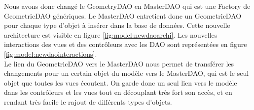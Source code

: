 		Nous avons donc changé le GeometryDAO en MasterDAO qui est une Factory de 
		GeometricDAO génériques. Le MasterDAO entretient donc un GeometricDAO pour chaque
		type d'objet à insérer dans la base de données. Cette nouvelle architecture 
		est visible en figure \ref{fig:model:newdaoarchi}. Les nouvelles interactions
		des vues et des contrôleurs avec les DAO sont représentées en figure
		\ref{fig:model:newdaointeractions}.\\

		Le lien du GeometricDAO vers le MasterDAO nous permet de transférer les changements
		pour un certain objet du modèle vers le MasterDAO, qui est le seul objet
		que toutes les vues écoutent. On garde donc un seul lien vers le modèle
		dans les contrôleurs et les vues tout en découplant très fort son accès,
		et en rendant très facile le rajout de différents types d'objets.\\

